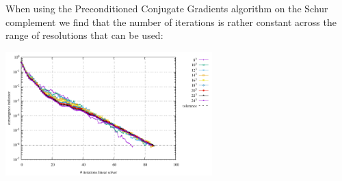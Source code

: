 When using the Preconditioned Conjugate Gradients algorithm on the Schur complement 
we find that the number of iterations is rather constant across the range of resolutions
that can be used:

\begin{center}
\includegraphics[width=8cm]{python_codes/fieldstone_82/results/bench5/solver_convergence.pdf}
\end{center}


